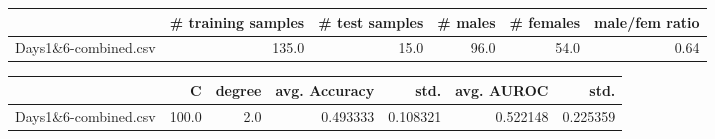\begin{tabular}{lrrrrr}
\hline
{} &  \# training samples &  \# test samples &  \# males &  \# females &  male/fem ratio \\
\hline
Days1\&6-combined.csv &               135.0 &            15.0 &     96.0 &       54.0 &            0.64 \\
\hline
\end{tabular}
\begin{tabular}{lrrrrrr}
\hline
{} &      C &  degree &  avg. Accuracy &      std. &  avg. AUROC &      std. \\
\hline
Days1\&6-combined.csv &  100.0 &     2.0 &       0.493333 &  0.108321 &    0.522148 &  0.225359 \\
\hline
\end{tabular}

